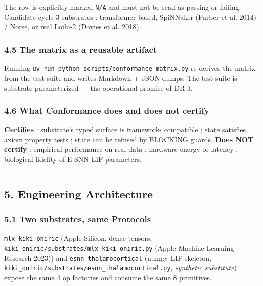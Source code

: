 \documentclass[
]{article}
\begin{document}
The row is explicitly marked \texttt{N/A} and must not be read as
passing or failing. Candidate cycle-3 substrates : transformer-based,
SpiNNaker (Furber et al. 2014) / Norse, or real Loihi-2 ({Davies et al.}
2018).

\subsubsection{4.5 The matrix as a reusable
artifact}\label{the-matrix-as-a-reusable-artifact}

Running \texttt{uv\ run\ python\ scripts/conformance\_matrix.py}
re-derives the matrix from the test suite and writes Markdown + JSON
dumps. The test suite is substrate-parameterized --- the operational
promise of DR-3.

\subsubsection{4.6 What Conformance does and does not
certify}\label{what-conformance-does-and-does-not-certify}

\textbf{Certifies} : substrate's typed surface is framework- compatible
; state satisfies axiom property tests ; state can be refused by
BLOCKING guards. \textbf{Does NOT certify} : empirical performance on
real data ; hardware energy or latency ; biological fidelity of E-SNN
LIF parameters.

\begin{center}\rule{0.5\linewidth}{0.5pt}\end{center}

\subsection{5. Engineering Architecture}\label{engineering-architecture}

\subsubsection{5.1 Two substrates, same
Protocols}\label{two-substrates-same-protocols}

\texttt{mlx\_kiki\_oniric} (Apple Silicon, dense tensors,
\texttt{kiki\_oniric/substrates/mlx\_kiki\_oniric.py} (Apple Machine
Learning Research 2023)) and \texttt{esnn\_thalamocortical} (numpy LIF
skeleton, \texttt{kiki\_oniric/substrates/esnn\_thalamocortical.py},
\emph{synthetic substitute}) expose the same 4 op factories and consume
the same 8 primitives.
\end{document}
